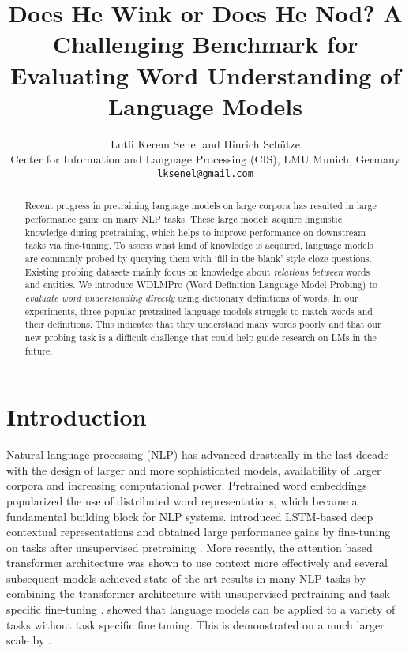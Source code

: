 \documentclass[11pt,a4paper]{article}
\title{%
Does He Wink or Does He Nod?
A Challenging Benchmark for Evaluating Word Understanding of Language Models}
\author{Lutfi Kerem Senel {\normalfont and} Hinrich Schütze \\
  Center for Information and Language Processing (CIS), LMU Munich, Germany \\
   \texttt{lksenel@gmail.com} 
  }
\date{}
\begin{document}
\maketitle
\begin{abstract}

Recent progress in pretraining language models on large
corpora has resulted in large performance gains on many NLP
tasks. These large models acquire linguistic knowledge
during pretraining, which helps to improve
performance on downstream tasks via fine-tuning. To assess
what kind of knowledge is acquired,
language models are commonly probed by querying them with
`fill in the blank' style cloze questions. Existing probing
datasets mainly focus on knowledge about \emph{relations between}
words and entities. We introduce WDLMPro
(Word Definition Language Model Probing) to \emph{evaluate word understanding
  directly} using dictionary definitions of
words. In our experiments, three popular pretrained
language models
struggle to match words and their  definitions. This
indicates that they understand many words poorly and that
our new probing task is a difficult challenge that could
help guide research on LMs in the future.
\end{abstract}



\section{Introduction}

Natural language processing (NLP)  has advanced drastically
in the last decade with the design of larger and more
sophisticated models, availability of larger
corpora and increasing computational
power. Pretrained word embeddings
\cite{mikolov13word2vec_b, pennington14glove} popularized
the use of distributed word representations, which became a
fundamental building block for NLP systems. 
\citet{peters18ELMO} introduced LSTM-based deep
contextual representations 
and obtained 
large performance gains 
by fine-tuning on  tasks after
unsupervised pretraining \cite{radford18fineTuning,
  howard18ULMFiT}. More recently, the attention based
transformer architecture was shown to use context more
effectively \cite{vaswani17transformers} and several
subsequent models achieved state of the art results in many
NLP tasks by combining the transformer architecture with
unsupervised pretraining and task specific fine-tuning
\cite{devlin19BERT, liu19RoBERTa}. 
showed that language models can be applied to a variety of
tasks without task specific fine tuning. This is demonstrated on a much larger scale by . 
\end{document}
